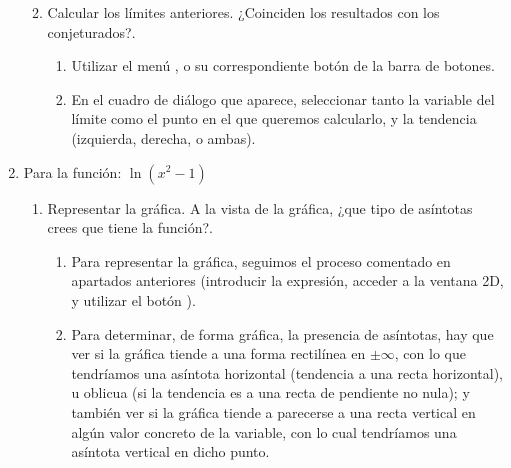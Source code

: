 \begin{enumerate}[leftmargin=*]
\begin{enumerate}
\begin{indicacion}
{\begin{enumerate}
\end{enumerate}

}
\end{indicacion}

\item  Calcular los límites anteriores. ¿Coinciden los resultados
con los conjeturados?.


\begin{indicacion}
{
\begin{enumerate}

\item Utilizar el menú , o su
correspondiente botón de la barra de botones.

\item En el cuadro de diálogo que aparece, seleccionar tanto la
variable del límite como el punto en el que queremos calcularlo, y
la tendencia (izquierda, derecha, o ambas).
\end{enumerate}
}
\end{indicacion}

\end{enumerate}

\item Para la función: $\ln(x^2-1)$

\begin{enumerate}

\item Representar la gráfica. A la vista de la gráfica, ¿que tipo
de asíntotas crees que tiene la función?.

\begin{indicacion}
{
\begin{enumerate}

\item Para representar la gráfica, seguimos el proceso comentado
en apartados anteriores (introducir la expresión, acceder a la
ventana 2D, y utilizar el botón ).

\item Para determinar, de forma gráfica, la presencia de
asíntotas, hay que ver si la gráfica tiende a una forma rectilínea
en $\pm \infty$, con lo que tendríamos una asíntota horizontal
(tendencia a una recta horizontal), u oblicua (si la tendencia es a
una recta de pendiente no nula); y también ver si la gráfica tiende
a parecerse a una recta vertical en algún valor concreto de la
variable, con lo cual tendríamos una asíntota vertical en dicho
punto.

\end{enumerate}

}
\end{indicacion}
\end{enumerate}
\end{enumerate}
